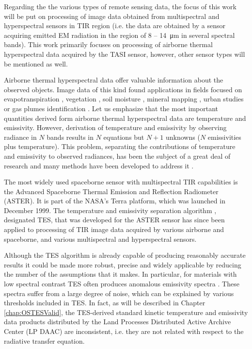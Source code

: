 Regarding the the various types of remote sensing data, the focus of this work will be put on processing of image data obtained from multispectral and hyperspectral sensors in TIR region (i.e. the data are obtained by a sensor acquiring emitted EM radiation in the region of 8 – \SI{14}{\micro\meter} in several spectral bands). This work primarily focuses on processing of airborne thermal hyperspectral data acquired by the TASI sensor, however, other sensor types will be mentioned as well.

Airborne thermal hyperspectral data offer valuable information about the observed objects. Image data of this kind found applications in fields focused on evapotranspiration \cite{PP12}, vegetation \cite{RC10}, soil moisture \cite{SF12}, mineral mapping \cite{NK14}, urban studies \cite{SO12} or gas plumes identification \cite{PM05}. Let us emphasize that the most important quantities derived form airborne thermal hyperspectral data are temperature and emissivity. However, derivation of temperature and emissivity by observing radiance in $N$ bands results in $N$ equations but $N+1$ unknowns ($N$ emissivities plus temperature). This problem, separating the contributions of temperature and emissivity to observed radiances, has been the subject of a great deal of research and many methods have been developed to address it \cite{LT13}.
 
 
The most widely used spaceborne sensor with multispectral TIR capabilities is the Advanced Spaceborne Thermal Emission and Reflection Radiometer (ASTER). It is part of the NASA's Terra platform, which was launched in December 1999. The temperature and emissivity separation algorithm \cite{GR98}, designated TES, that was developed for the ASTER sensor has since been applied to processing of TIR image data acquired by various airborne and spaceborne, and various multispectral and hyperspectral sensors.

Although the TES algorithm is already capable of producing reasonably accurate results it could be made more robust, precise and widely applicable by reducing the number of the assumptions that it makes. In particular, for materials with low spectral contrast TES often produces anomalous emissivity spectra \cite{CC07, SJ07}. These spectra suffer from a large degree of noise, which can be explained by various thresholds included in TES. In fact, as will be described in Chapter \ref{chap:OSTESValid}, the TES-derived standard kinetic temperature and emissivity data products distributed by the Land Processes Distributed Active Archive Center (LP DAAC) are inconsistent, i.e. they are not related with respect to the radiative transfer equation.

